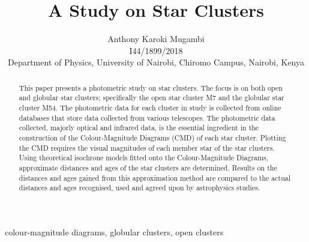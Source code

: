 \documentclass[12pt]{article}
\title{A Study on Star Clusters}
\author{Anthony Karoki Mugambi\\
	\small I44/1899/2018\\
	\small Department of Physics, University of Nairobi, Chiromo Campus, Nairobi, Kenya
}
\date{}
\providecommand{\keywords}[1]
{
	\small	
	\textbf{\text{Keywords: }} #1
}
\begin{document}
	\maketitle
	
	\begin{abstract}
		This paper presents a photometric study on star clusters. The focus is on both open and globular star clusters; specifically the open star cluster M7 and the globular star cluster M54. The photometric data for each cluster in study is collected from online databases that store data collected from various telescopes. The photometric data collected, majorly optical and infrared data, is the essential ingredient in the construction of the Colour-Magnitude Diagrams (CMD) of each star cluster. Plotting the CMD requires the visual magnitudes of each member star of the star clusters. Using theoretical isochrone models fitted onto the Colour-Magnitude Diagrams, approximate distances and ages of the star clusters are determined. Results on the distances and ages gained from this approximation method are compared to the actual distances and ages recognised, used and agreed upon by astrophysics studies.
		
	\end{abstract}

	\keywords{colour-magnitude diagrams, globular clusters, open clusters}
	
	

	\pagebreak
\end{document}
